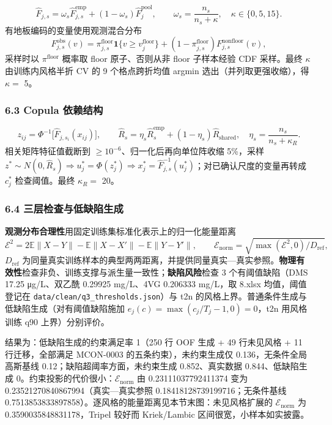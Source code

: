 \documentclass[
  11pt,
]{article}
\begin{document}
\[
\widehat F_{j,s}=\omega_s\widehat F^{\mathrm{emp}}_{j,s}+(1-\omega_s)\widehat F^{\mathrm{pool}}_j,\qquad \omega_s=\frac{n_s}{n_s+\kappa},\quad \kappa\in\{0,5,15\}.
\] 有地板编码的变量使用观测混合分布 \[
F^{\mathrm{obs}}_{j,s}(v)=\pi^{\mathrm{floor}}_{j,s}\mathbf 1\{v\ge v_j^{\mathrm{floor}}\}+(1-\pi^{\mathrm{floor}}_{j,s})F^{\mathrm{nonfloor}}_{j,s}(v),
\] 采样时以 \(\pi^{\mathrm{floor}}\) 概率取 floor 原子、否则从非 floor
子样本经验 CDF 采样。最终 \(\kappa\) 由训练内风格半折 CV 的 9
个格点跨折均值 argmin 选出（并列取更强收缩），得 \(\kappa=\) 5。

\subsubsection{6.3 Copula
依赖结构}\label{copula-ux4f9dux8d56ux7ed3ux6784}

\[
z_{ij}=\Phi^{-1}\big[\widehat F_{j,s_i}(x_{ij})\big],\qquad \widehat R_s=\eta_s\widehat R_s^{\mathrm{emp}}+(1-\eta_s)\widehat R_{\mathrm{shared}},\quad \eta_s=\frac{n_s}{n_s+\kappa_R}.
\] 相关矩阵特征值截断到 \(\ge10^{-6}\)、归一化后再向单位阵收缩 5\%，采样
\(z^*\sim N(0,\widehat R_s)\Rightarrow u_j^*=\Phi(z_j^*)\Rightarrow x_j^*=\widehat F_{j,s}^{-1}(u_j^*)\)；对已确认尺度的变量再转成
\(c_j^*\) 检查阈值。最终 \(\kappa_R=\) 20。

\subsubsection{6.4
三层检查与低缺陷生成}\label{ux4e09ux5c42ux68c0ux67e5ux4e0eux4f4eux7f3aux9677ux751fux6210}

\textbf{观测分布合理性}用固定训练集标准化表示上的归一化能量距离 \[
\mathcal E^2=2\mathbb E\|X-Y\|-\mathbb E\|X-X'\|-\mathbb E\|Y-Y'\|,\qquad \mathcal E_{\mathrm{norm}}=\sqrt{\max(\mathcal E^2,0)/D_{\mathrm{ref}}},
\] \(D_{\mathrm{ref}}\)
为同量真实训练样本的典型两两距离，并提供同量真实---真实参照。\textbf{物理有效性}检查非负、训练支撑与派生量一致性；\textbf{缺陷风险}检查
3 个有阈值缺陷（DMS 17.25 μg/L、双乙酰 0.29925 mg/L、4VG 0.206333
mg/L，取 8.xlsx 均值，阈值登记在
\texttt{data/clean/q3\_thresholds.json}）与 t2n
的风格上界。普通条件生成与低缺陷生成（对有阈值缺陷施加
\(e_j(c)=\max(c_j/T_j-1,0)=0\)，t2n 用风格训练 q90 上界）分别评价。

结果为：低缺陷生成的约束满足率 1（250 行 OOF 生成 + 49 行未见风格 + 11
行迁移，全部满足 MCON-0003 的五条约束），未约束生成仅
0.136，无条件全局高斯基线 0.12；缺陷超阈率方面，未约束生成
0.852、真实数据 0.844、低缺陷生成
0。约束投影的代价很小：\(\mathcal E_{\mathrm{norm}}\) 由
0.23111037792411374 变为 0.23521270840867994（真实---真实参照
0.18418128739199716；无条件基线
0.7513853833897858）。逐风格的能量距离见本节末图：未见风格扩展的
\(\mathcal E_{\mathrm{norm}}\) 为 0.3590035848831178，Tripel 较好而
Kriek/Lambic 区间很宽，小样本如实披露。
\end{document}
